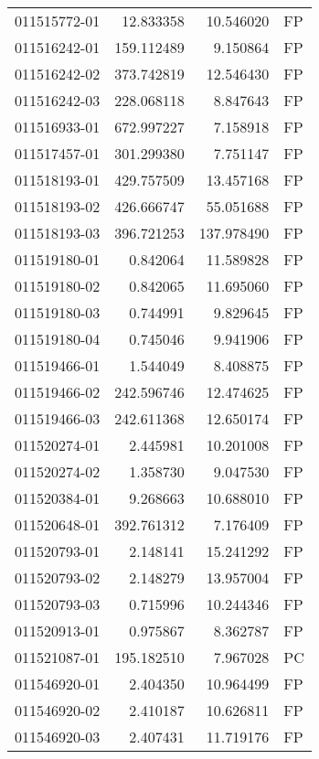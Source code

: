 \begin{tabular}{lrrl}
011515772-01 &   12.833358 &      10.546020 &   FP \\
011516242-01 &  159.112489 &       9.150864 &   FP \\
011516242-02 &  373.742819 &      12.546430 &   FP \\
011516242-03 &  228.068118 &       8.847643 &   FP \\
011516933-01 &  672.997227 &       7.158918 &   FP \\
011517457-01 &  301.299380 &       7.751147 &   FP \\
011518193-01 &  429.757509 &      13.457168 &   FP \\
011518193-02 &  426.666747 &      55.051688 &   FP \\
011518193-03 &  396.721253 &     137.978490 &   FP \\
011519180-01 &    0.842064 &      11.589828 &   FP \\
011519180-02 &    0.842065 &      11.695060 &   FP \\
011519180-03 &    0.744991 &       9.829645 &   FP \\
011519180-04 &    0.745046 &       9.941906 &   FP \\
011519466-01 &    1.544049 &       8.408875 &   FP \\
011519466-02 &  242.596746 &      12.474625 &   FP \\
011519466-03 &  242.611368 &      12.650174 &   FP \\
011520274-01 &    2.445981 &      10.201008 &   FP \\
011520274-02 &    1.358730 &       9.047530 &   FP \\
011520384-01 &    9.268663 &      10.688010 &   FP \\
011520648-01 &  392.761312 &       7.176409 &   FP \\
011520793-01 &    2.148141 &      15.241292 &   FP \\
011520793-02 &    2.148279 &      13.957004 &   FP \\
011520793-03 &    0.715996 &      10.244346 &   FP \\
011520913-01 &    0.975867 &       8.362787 &   FP \\
011521087-01 &  195.182510 &       7.967028 &   PC \\
011546920-01 &    2.404350 &      10.964499 &   FP \\
011546920-02 &    2.410187 &      10.626811 &   FP \\
011546920-03 &    2.407431 &      11.719176 &   FP \\

\end{tabular}

